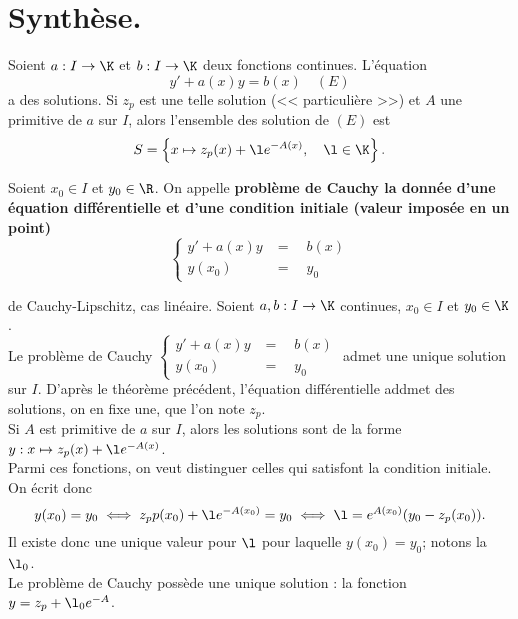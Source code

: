 \documentclass[11pt]{article}
\begin{document}
\section{Synthèse.}

\begin{thm}{}{}
    Soient $a:I\to\K$ et $b:I\to\K$ deux fonctions continues. L'équation
    \begin{equation*}
        y'+a(x)y=b(x) \quad (E)
    \end{equation*}
    a des solutions. Si $z_p$ est une telle solution (<< particulière >>) et $A$ une primitive de $a$ sur $I$, alors l'ensemble des solution de $(E)$ est
    \begin{equation*}
        S=\left\{ x \mapsto z_p(x) + \l e^{-A(x)}, \quad \l \in \K \right\}.
    \end{equation*}
\end{thm}

\begin{defi}{}{}
    Soient $x_0\in I$ et $y_0\in \R$. On appelle \bf{problème de Cauchy} la donnée d'une équation différentielle et d'une condition initiale (valeur imposée en un point)
    \begin{equation*}
        \begin{cases}
            y'+a(x)y &= \quad b(x)\\
            y(x_0) &= \quad y_0
        \end{cases}
    \end{equation*}
\end{defi}

\pagebreak

\begin{thm}{de Cauchy-Lipschitz, cas linéaire.}{}
    Soient $a,b:I\to\K$ continues, $x_0\in I$ et $y_0\in\K$.\\
    Le problème de Cauchy $\displaystyle \begin{cases}y'+a(x)y &= \quad b(x)\\ y(x_0) &= \quad y_0\end{cases}$ admet une unique solution sur $I$.
    \tcblower
    D'après le théorème précédent, l'équation différentielle addmet des solutions, on en fixe une, que l'on note $z_p$.\\
    Si $A$ est primitive de $a$ sur $I$, alors les solutions sont de la forme $y:x\mapsto z_p(x)+\l e^{-A(x)}$.\\
    Parmi ces fonctions, on veut distinguer celles qui satisfont la condition initiale. On écrit donc
    \begin{equation*}
        y(x_0) = y_0 \iff z_pp(x_0) + \l e^{-A(x_0)} = y_0 \iff \l = e^{A(x_0)}(y_0-z_p(x_0)).
    \end{equation*}
    Il existe donc une unique valeur pour $\l$ pour laquelle $y(x_0)=y_0$; notons la $\l_0$.\\
    Le problème de Cauchy possède une unique solution : la fonction $y=z_p+\l_0 e^{-A}$.
\end{thm}
\end{document}
